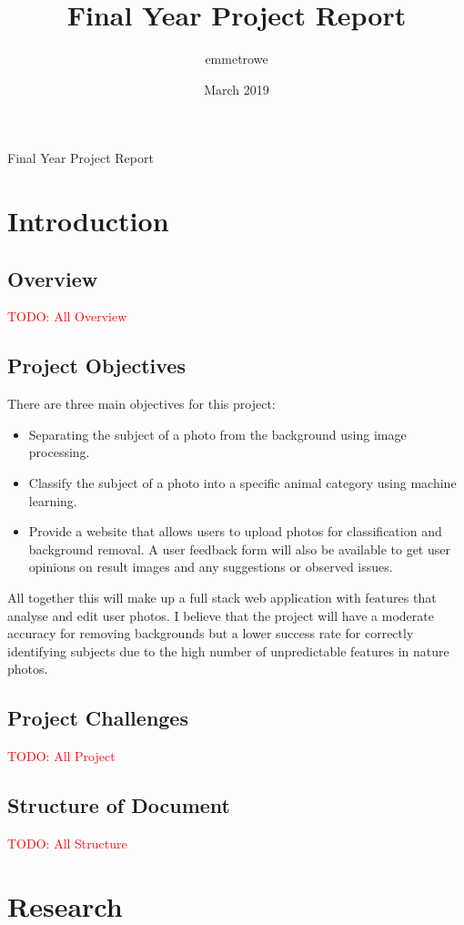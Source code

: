 \documentclass[12pt]{article}
\title{Final Year Project Report}
\author{emmetrowe}
\date{March 2019}
\begin{document}
\begin{titlepage}

Final Year Project Report

\end{titlepage}
\newpage
\tableofcontents
\newpage
\section{Introduction}

\subsection{Overview}
\textcolor{red}{TODO: All Overview}
    
    \subsection{Project Objectives}
There are three main objectives for this project:
\begin{itemize}
    \item Separating the subject of a photo from the background using image processing.
    \item Classify the subject of a photo into a specific animal category using machine learning.
    \item Provide a website that allows users to upload photos for classification and background removal. A user feedback form will also be available to get user opinions on result images and any suggestions or observed issues.
\end{itemize}
All together this will make up a full stack web application with features that
analyse and edit user photos.
I believe that the project will have a moderate accuracy for removing backgrounds but
a lower success rate for correctly identifying subjects due to the high number of
unpredictable features in nature photos.

    
    \subsection{Project Challenges}
    \textcolor{red}{TODO: All Project}
    
    \subsection{Structure of Document}
    \textcolor{red}{TODO: All Structure}

    
\section{Research}
\end{document}
